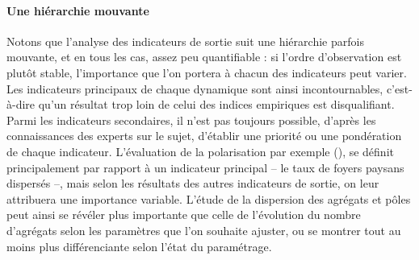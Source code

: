 \paragraph{Une hiérarchie mouvante}
Notons que l'analyse des indicateurs de sortie suit une hiérarchie parfois mouvante, et en tous les cas, assez peu quantifiable : si l'ordre d'observation est plutôt stable, l'importance que l'on portera à chacun des indicateurs peut varier.
Les indicateurs principaux de chaque dynamique sont ainsi \og incontournables\fg{}, c'est-à-dire qu'un résultat trop loin de celui des indices empiriques est disqualifiant.
Parmi les indicateurs secondaires, il n'est pas toujours possible, d'après les connaissances des experts sur le sujet, d'établir une priorité ou une pondération de chaque indicateur. L'évaluation de la polarisation par exemple (), se définit principalement par rapport à un indicateur principal -- le taux de foyers paysans dispersés --, mais selon les résultats des autres indicateurs de sortie, on leur attribuera une importance variable. L'étude de la dispersion des agrégats et pôles peut ainsi se révéler plus importante que celle de l'évolution du nombre d'agrégats selon les paramètres que l'on souhaite ajuster, ou se montrer tout au moins plus différenciante selon l'état du paramétrage.


